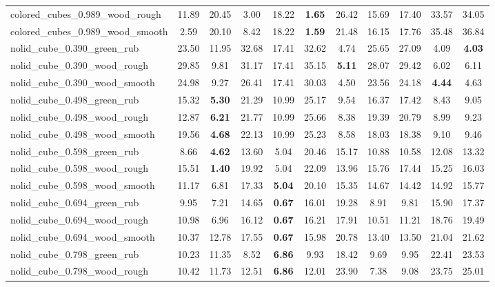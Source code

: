 \begin{table}[H]
{\begin{tabular}{l cccccccccc}
        colored\_cubes\_0.989\_wood\_rough & 11.89 & 20.45 & 3.00 & 18.22 & \textbf{1.65} & 26.42 & 15.69 & 17.40 & 33.57 & 34.05 \\
        colored\_cubes\_0.989\_wood\_smooth & 2.59 & 20.10 & 8.42 & 18.22 & \textbf{1.59} & 21.48 & 16.15 & 17.76 & 35.48 & 36.84 \\
        nolid\_cube\_0.390\_green\_rub & 23.50 & 11.95 & 32.68 & 17.41 & 32.62 & 4.74 & 25.65 & 27.09 & 4.09 & \textbf{4.03} \\
        nolid\_cube\_0.390\_wood\_rough & 29.85 & 9.81 & 31.17 & 17.41 & 35.15 & \textbf{5.11} & 28.07 & 29.42 & 6.02 & 6.11 \\
        nolid\_cube\_0.390\_wood\_smooth & 24.98 & 9.27 & 26.41 & 17.41 & 30.03 & 4.50 & 23.56 & 24.18 & \textbf{4.44} & 4.63 \\
        nolid\_cube\_0.498\_green\_rub & 15.32 & \textbf{5.30} & 21.29 & 10.99 & 25.17 & 9.54 & 16.37 & 17.42 & 8.43 & 9.05 \\
        nolid\_cube\_0.498\_wood\_rough & 12.87 & \textbf{6.21} & 21.77 & 10.99 & 25.66 & 8.38 & 19.39 & 20.79 & 8.99 & 9.23 \\
        nolid\_cube\_0.498\_wood\_smooth & 19.56 & \textbf{4.68} & 22.13 & 10.99 & 25.23 & 8.58 & 18.03 & 18.38 & 9.10 & 9.46 \\
        nolid\_cube\_0.598\_green\_rub & 8.66 & \textbf{4.62} & 13.60 & 5.04 & 20.46 & 15.17 & 10.88 & 10.58 & 12.08 & 13.32 \\
        nolid\_cube\_0.598\_wood\_rough & 15.51 & \textbf{1.40} & 19.92 & 5.04 & 22.09 & 13.96 & 15.76 & 17.44 & 15.25 & 16.03 \\
        nolid\_cube\_0.598\_wood\_smooth & 11.17 & 6.81 & 17.33 & \textbf{5.04} & 20.10 & 15.35 & 14.67 & 14.42 & 14.92 & 15.77 \\
        nolid\_cube\_0.694\_green\_rub & 9.95 & 7.21 & 14.65 & \textbf{0.67} & 16.01 & 19.28 & 8.91 & 9.81 & 15.90 & 17.37 \\
        nolid\_cube\_0.694\_wood\_rough & 10.98 & 6.96 & 16.12 & \textbf{0.67} & 16.21 & 17.91 & 10.51 & 11.21 & 18.76 & 19.49 \\
        nolid\_cube\_0.694\_wood\_smooth & 10.37 & 12.78 & 17.55 & \textbf{0.67} & 15.98 & 20.78 & 13.40 & 13.50 & 21.04 & 21.62 \\
        nolid\_cube\_0.798\_green\_rub & 10.23 & 11.35 & 8.52 & \textbf{6.86} & 9.93 & 18.42 & 9.69 & 9.95 & 22.41 & 23.53 \\
        nolid\_cube\_0.798\_wood\_rough & 10.42 & 11.73 & 12.51 & \textbf{6.86} & 12.01 & 23.90 & 7.38 & 9.08 & 23.75 & 25.01 \\

\end{tabular}}
\end{table}
